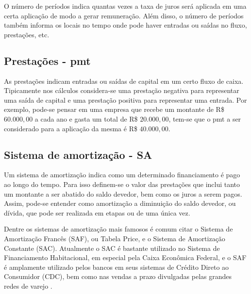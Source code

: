 O número de períodos indica quantas vezes a taxa de juros será aplicada em uma certa aplicação de modo a gerar remuneração. Além disso, o número de períodos também informa os locais no tempo onde pode haver entradas ou saídas no fluxo, prestações, etc.

\subsection{Prestações - pmt}

As prestações indicam entradas ou saídas de capital em um certo fluxo de caixa. Tipicamente nos cálculos considera-se uma prestação negativa para representar uma saída de capital e uma prestação positiva para representar uma entrada. Por exemplo, pode-se pensar em uma empresa que recebe um montante de R\$ $60.000,00$ a cada ano e gasta um total de R\$ $20.000,00$, tem-se que o pmt a ser considerado para a aplicação da mesma é R\$ $40.000,00$.


\subsection{Sistema de amortização - SA}

Um sistema de amortização indica como um determinado financiamento é pago ao longo do tempo. Para isso definem-se o valor das prestações que inclui tanto um montante a ser abatido do saldo devedor, bem como os juros a serem pagos. Assim, pode-se entender como amortização a diminuição do saldo devedor, ou dívida, que pode ser realizada em etapas ou de uma única vez.

Dentre os sistemas de amortização mais famosos é comum citar o Sistema de Amortização Francês (SAF), ou Tabela Price, e o Sistema de Amortização Constante (SAC). Atualmente o SAC é bastante utilizado no Sistema de Financiamento Habitacional, em especial pela Caixa Econômica Federal, e o SAF é amplamente utilizado pelos bancos em seus sistemas de Crédito Direto ao Consumidor (CDC), bem como nas vendas a prazo divulgadas pelas grandes redes de varejo \cite{usoSACSAF}.

